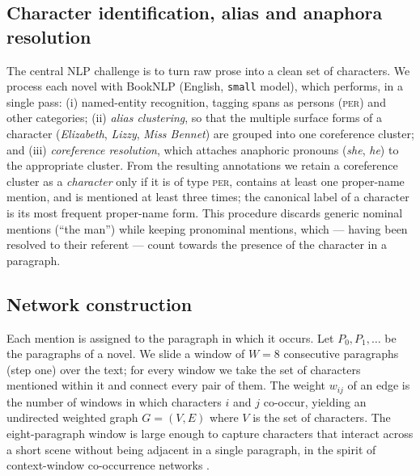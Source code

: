 \documentclass[preprint,12pt]{elsarticle}
\begin{document}
\begin{table}[H]
\centering
\caption{The ten-novel corpus and the size of the extracted networks.}
\label{tab:corpus}
\resizebox{\textwidth}{!}{}
\end{table}

\subsection{Character identification, alias and anaphora resolution}
The central NLP challenge is to turn raw prose into a clean set of characters.
We process each novel with BookNLP (English, \texttt{small} model), which
performs, in a single pass: (i) named-entity recognition, tagging spans as
persons (\textsc{per}) and other categories; (ii) \emph{alias clustering}, so
that the multiple surface forms of a character (\emph{Elizabeth}, \emph{Lizzy},
\emph{Miss Bennet}) are grouped into one coreference cluster; and (iii)
\emph{coreference resolution}, which attaches anaphoric pronouns
(\emph{she}, \emph{he}) to the appropriate cluster. From the resulting
annotations we retain a coreference cluster as a \emph{character} only if it is of
type \textsc{per}, contains at least one proper-name mention, and is mentioned at
least three times; the canonical label of a character is its most frequent
proper-name form. This procedure discards generic nominal mentions
(``the man'') while keeping pronominal mentions, which --- having been resolved
to their referent --- count towards the presence of the character in a paragraph.

\subsection{Network construction}
Each mention is assigned to the paragraph in which it occurs. Let
$P_0,P_1,\dots$ be the paragraphs of a novel. We slide a window of
$W=8$ consecutive paragraphs (step one) over the text; for every window we take
the set of characters mentioned within it and connect every pair of them. The
weight $w_{ij}$ of an edge is the number of windows in which characters $i$ and
$j$ co-occur, yielding an undirected weighted graph $G=(V,E)$ where $V$ is the
set of characters. The eight-paragraph window is large enough to capture
characters that interact across a short scene without being adjacent in a single
paragraph, in the spirit of context-window co-occurrence
networks \cite{amancio2016entity}.
\end{document}
